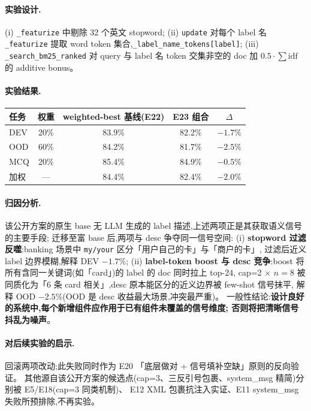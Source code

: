 \documentclass[11pt,a4paper]{ctexart}
\begin{document}
\paragraph{实验设计.}
(i) \texttt{\_featurize} 中剔除 32 个英文 stopword;
(ii) \texttt{update} 对每个 label 名 \texttt{\_featurize} 提取 word token 集合,\texttt{\_label\_name\_tokens[label]};
(iii) \texttt{\_search\_bm25\_ranked} 对 query 与 label 名 token 交集非空的 doc 加 $0.5 \cdot \sum \mathrm{idf}$ 的 additive bonus。

\paragraph{实验结果.}

\begin{table}[h]
\centering
\small
\begin{tabular}{lcccc}
\toprule
任务 & 权重 & weighted-best 基线(E22) & E23 组合 & $\Delta$ \\
\midrule
DEV & 20\% & 83.9\% & 82.2\% & $-1.7\%$ \\
OOD & 60\% & 84.2\% & 81.7\% & $\mathbf{-2.5\%}$ \\
MCQ & 20\% & 85.4\% & 84.9\% & $-0.5\%$ \\
加权 & — & 84.4\% & 82.4\% & $\mathbf{-2.0\%}$ \\
\bottomrule
\end{tabular}
\end{table}

\paragraph{归因分析.}该公开方案的原生 base 无 LLM 生成的 label 描述,上述两项正是其获取语义信号的主要手段;
迁移至富 base 后,两项与 desc 争夺同一信号空间:
(i) \textbf{stopword 过滤反噬}:banking 场景中 \texttt{my/your} 区分「用户自己的卡」与「商户的卡」,
过滤后近义 label 边界模糊,解释 DEV $-1.7\%$;
(ii) \textbf{label-token boost 与 desc 竞争}:boost 将所有含同一关键词(如「card」)的 label 的 doc 同时拉上 top-24,
cap=2 $\times$ $n=8$ 被同质化为「6 条 card 相关」,desc 原本能区分的近义边界被 few-shot 信号抹平,
解释 OOD $-2.5\%$(OOD 是 desc 收益最大场景,冲突最严重)。
一般性结论:\textbf{设计良好的系统中,每个新增组件应作用于已有组件未覆盖的信号维度;
否则将把清晰信号抖乱为噪声}。

\paragraph{对后续实验的启示.}回滚两项改动;此失败同时作为 E20 「底层做对 + 信号填补空缺」原则的反向验证。
其他源自该公开方案的候选点(cap=3、三反引号包裹、system\_msg 精简)分别被 E5/E18(cap=3 同类机制)、
E12 XML 包裹抗注入实证、E11 system\_msg 失败所预排除,不再实验。
\end{document}
